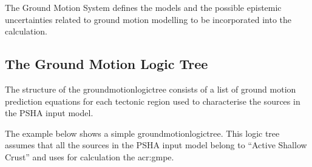 The Ground Motion System defines the models and the possible epistemic
uncertainties related to ground motion modelling to be incorporated into the
calculation.

\subsection{The Ground Motion Logic Tree}
\label{subsec:gmlt}

The structure of the \gls{groundmotionlogictree} consists of a list of ground
motion prediction equations for each tectonic region used to characterise the
sources in the PSHA input model.

The example below shows a simple \gls{groundmotionlogictree}. This logic tree
assumes that all the sources in the PSHA input model belong to ``Active
Shallow Crust'' and uses for calculation the \citet{chiou2008}
\gls{acr:gmpe}.


